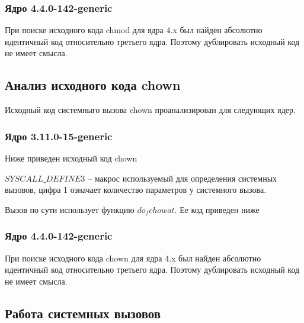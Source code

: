 


\subsubsection{Ядро 4.4.0-142-generic}

\par При поиске исходного кода chmod для ядра 4.x был найден абсолютно идентичный код относительно третьего ядра. Поэтому дублировать исходный код не имеет смысла.


\subsection{Анализ исходного кода chown} %

\par Исходный код системныго вызова chown проанализирован для следующих ядер.

\subsubsection{Ядро 3.11.0-15-generic}

\par Ниже приведен исходный код chown


\par $SYSCALL\_DEFINE3$ -- макрос используемый для определения системных вызовов, цифра 1 означает количество параметров у системного вызова. 

\par Вызов по сути использует функцию $do_fchowat$. Ее код приведен ниже





\subsubsection{Ядро 4.4.0-142-generic}

\par При поиске исходного кода  chown для ядра 4.x был найден абсолютно идентичный код относительно третьего ядра. Поэтому дублировать исходный код не имеет смысла.


\subsection{Работа системных вызовов} %

